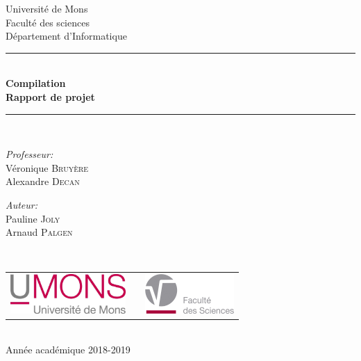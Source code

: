 \documentclass[a4paper, 12pt]{article}
\begin{document}
\begin{titlepage}
\begin{center}

{\Large Université de Mons}\\[1ex]
{\Large Faculté des sciences}\\[1ex]
{\Large Département d'Informatique}\\[2.5cm]

\newcommand{\HRule}{\rule{\linewidth}{0.3mm}}
\HRule \\[0.3cm]
{ \LARGE \bfseries Compilation\\[0.3cm]}
{ \LARGE \bfseries Rapport de projet\\[0.1cm]} %
\HRule \\[1.5cm]

\begin{minipage}[t]{0.45\textwidth}
\begin{flushleft} \large
\emph{Professeur:}\\
Véronique \textsc{Bruyère}\\
Alexandre \textsc{Decan}
\end{flushleft}
\end{minipage}
\begin{minipage}[t]{0.45\textwidth}
\begin{flushright} \large
\emph{Auteur:} \\
Pauline \textsc{Joly}\\
Arnaud \textsc{Palgen}
\end{flushright}
\end{minipage}\\[2ex]

\vfill

\begin{center}
\begin{tabular}[t]{c c c}
\includegraphics[height=1.5cm]{logoumons.jpg} &
\hspace{0.3cm} &
\includegraphics[height=1.5cm]{logofs.jpg}
\end{tabular}
\end{center}~\\
 
{\large Année académique 2018-2019}

\end{center}
\end{titlepage}
\tableofcontents
\newpage
\end{document}
